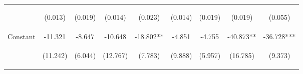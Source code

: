 \begin{center}
\begin{tabular}{lcccccccc}
\vspace{4pt} & \begin{footnotesize}(0.013)\end{footnotesize} & \begin{footnotesize}(0.019)\end{footnotesize} & \begin{footnotesize}(0.014)\end{footnotesize} & \begin{footnotesize}(0.023)\end{footnotesize} & \begin{footnotesize}(0.014)\end{footnotesize} & \begin{footnotesize}(0.019)\end{footnotesize} & \begin{footnotesize}(0.019)\end{footnotesize} & \begin{footnotesize}(0.055)\end{footnotesize} \\
Constant & -11.321 & -8.647 & -10.648 & -18.802** & -4.851 & -4.755 & -40.873** & -36.728*** \\
 & \begin{footnotesize}(11.242)\end{footnotesize} & \begin{footnotesize}(6.044)\end{footnotesize} & \begin{footnotesize}(12.767)\end{footnotesize} & \begin{footnotesize}(7.783)\end{footnotesize} & \begin{footnotesize}(9.888)\end{footnotesize} & \begin{footnotesize}(5.957)\end{footnotesize} & \begin{footnotesize}(16.785)\end{footnotesize} & \begin{footnotesize}(9.373)\end{footnotesize} \\

\end{tabular}
\end{center}
